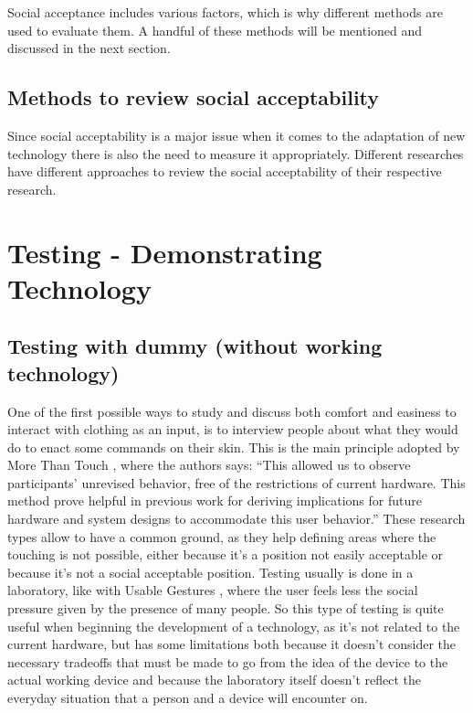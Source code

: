 \documentclass{sigchi}
\begin{document}
Social acceptance includes various factors, which is why different methods are used to evaluate them. A handful of these methods will be mentioned and discussed in the next section.

\subsection{Methods to review social acceptability}
%

Since social acceptability is a major issue when it comes to the adaptation of new technology there is also the need to measure it appropriately. Different researches have different approaches to review the social acceptability of their respective research. \cite{touch-wrist}

\section{Testing - Demonstrating Technology}

\subsection{Testing with dummy (without working technology)}
One of the first possible ways to study and discuss both comfort and easiness  to interact with clothing as an input, is to interview people about what they would do to enact some commands on their skin. This is the main principle adopted by More Than Touch \cite[p. 181]{more-touch}, where the authors says: “This allowed us to observe participants’ unrevised behavior, free of the restrictions of current hardware. This method prove helpful in previous work for deriving implications for future hardware and system designs to accommodate this user behavior.”
These research types allow to have a common ground, as they help defining areas where the touching is not possible, either because it’s a position not easily acceptable or because it’s not a social acceptable position. Testing usually is done in a laboratory, like with Usable Gestures \cite{usable-gesture}, where the user feels less the social pressure given by the presence of many people. So this type of testing is quite useful when beginning the development of a technology, as it’s not related to the current hardware, but has some limitations both because it doesn’t consider the necessary tradeoffs that must be made to go from the idea of the device to the actual working device and because the laboratory itself doesn’t reflect the everyday situation that a person and a device will encounter on.
\end{document}

